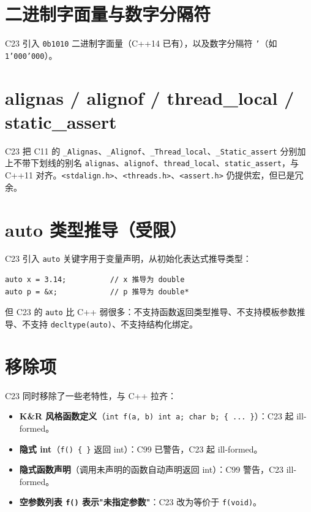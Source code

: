 \documentclass[12pt,a4paper,fontset=fandol]{ctexbook}
\newcommand{\clabel}{%
  \tcbox[on line,colback=cheadbg,colframe=cheadbg,
    boxrule=0pt,arc=1pt,left=2pt,right=2pt,top=1pt,bottom=1pt,
    colupper=white,fontupper=\scriptsize\bfseries]{C}}
\newcommand{\cpp}[1]{C++#1}
\newcommand{\kw}[1]{\texttt{#1}}
\begin{document}
\section{二进制字面量与数字分隔符}

\clabel{} C23 引入 \kw{0b1010} 二进制字面量（\cpp{}14 已有），以及数字分隔符 \kw{'}（如 \kw{1'000'000}）。

\section{alignas / alignof / thread\_local / static\_assert}

C23 把 C11 的 \kw{\_Alignas}、\kw{\_Alignof}、\kw{\_Thread\_local}、\kw{\_Static\_assert} 分别加上不带下划线的别名 \kw{alignas}、\kw{alignof}、\kw{thread\_local}、\kw{static\_assert}，与 \cpp{}11 对齐。\kw{<stdalign.h>}、\kw{<threads.h>}、\kw{<assert.h>} 仍提供宏，但已是冗余。

\section{auto 类型推导（受限）}

C23 引入 \kw{auto} 关键字用于变量声明，从初始化表达式推导类型：

\clabel{}
\begin{lstlisting}[style=cstyle]
auto x = 3.14;          // x 推导为 double
auto p = &x;            // p 推导为 double*
\end{lstlisting}

但 C23 的 \kw{auto} 比 \cpp{} 弱很多：不支持函数返回类型推导、不支持模板参数推导、不支持 \kw{decltype(auto)}、不支持结构化绑定。

\section{移除项}

C23 同时移除了一些老特性，与 \cpp{} 拉齐：
\begin{itemize}
  \item \textbf{K\&R 风格函数定义}（\kw{int f(a, b) int a; char b; \{ ... \}}）：C23 起 ill-formed。
  \item \textbf{隐式 int}（\kw{f() \{ \}} 返回 int）：C99 已警告，C23 起 ill-formed。
  \item \textbf{隐式函数声明}（调用未声明的函数自动声明返回 int）：C99 警告，C23 ill-formed。
  \item \textbf{空参数列表 \kw{f()} 表示"未指定参数"}：C23 改为等价于 \kw{f(void)}。
\end{itemize}
\end{document}
